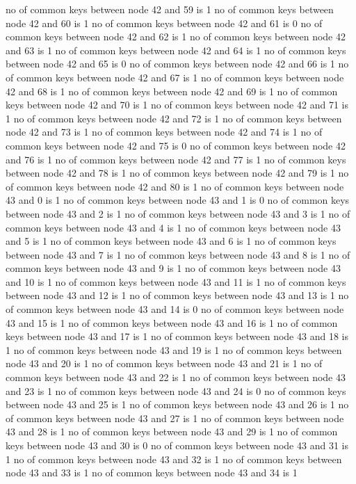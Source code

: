 no of common keys between node 42 and 59 is 1
no of common keys between node 42 and 60 is 1
no of common keys between node 42 and 61 is 0
no of common keys between node 42 and 62 is 1
no of common keys between node 42 and 63 is 1
no of common keys between node 42 and 64 is 1
no of common keys between node 42 and 65 is 0
no of common keys between node 42 and 66 is 1
no of common keys between node 42 and 67 is 1
no of common keys between node 42 and 68 is 1
no of common keys between node 42 and 69 is 1
no of common keys between node 42 and 70 is 1
no of common keys between node 42 and 71 is 1
no of common keys between node 42 and 72 is 1
no of common keys between node 42 and 73 is 1
no of common keys between node 42 and 74 is 1
no of common keys between node 42 and 75 is 0
no of common keys between node 42 and 76 is 1
no of common keys between node 42 and 77 is 1
no of common keys between node 42 and 78 is 1
no of common keys between node 42 and 79 is 1
no of common keys between node 42 and 80 is 1
no of common keys between node 43 and 0 is 1
no of common keys between node 43 and 1 is 0
no of common keys between node 43 and 2 is 1
no of common keys between node 43 and 3 is 1
no of common keys between node 43 and 4 is 1
no of common keys between node 43 and 5 is 1
no of common keys between node 43 and 6 is 1
no of common keys between node 43 and 7 is 1
no of common keys between node 43 and 8 is 1
no of common keys between node 43 and 9 is 1
no of common keys between node 43 and 10 is 1
no of common keys between node 43 and 11 is 1
no of common keys between node 43 and 12 is 1
no of common keys between node 43 and 13 is 1
no of common keys between node 43 and 14 is 0
no of common keys between node 43 and 15 is 1
no of common keys between node 43 and 16 is 1
no of common keys between node 43 and 17 is 1
no of common keys between node 43 and 18 is 1
no of common keys between node 43 and 19 is 1
no of common keys between node 43 and 20 is 1
no of common keys between node 43 and 21 is 1
no of common keys between node 43 and 22 is 1
no of common keys between node 43 and 23 is 1
no of common keys between node 43 and 24 is 0
no of common keys between node 43 and 25 is 1
no of common keys between node 43 and 26 is 1
no of common keys between node 43 and 27 is 1
no of common keys between node 43 and 28 is 1
no of common keys between node 43 and 29 is 1
no of common keys between node 43 and 30 is 0
no of common keys between node 43 and 31 is 1
no of common keys between node 43 and 32 is 1
no of common keys between node 43 and 33 is 1
no of common keys between node 43 and 34 is 1
